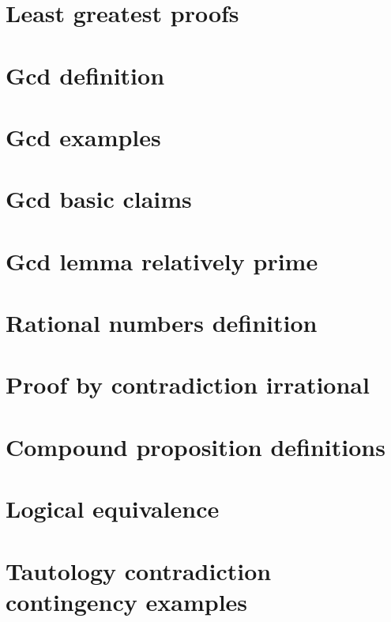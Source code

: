 \section*{Least greatest proofs}

\vfill
\section*{Gcd definition}

\vfill
\section*{Gcd examples}

\vfill
\section*{Gcd basic claims}

\vfill
\section*{Gcd lemma relatively prime}

\vfill
\section*{Rational numbers definition}

\vfill
\section*{Proof by contradiction irrational}

\vfill
\section*{Compound proposition definitions}

\vfill
\section*{Logical equivalence}

\vfill
\section*{Tautology contradiction contingency examples}

\vfill
